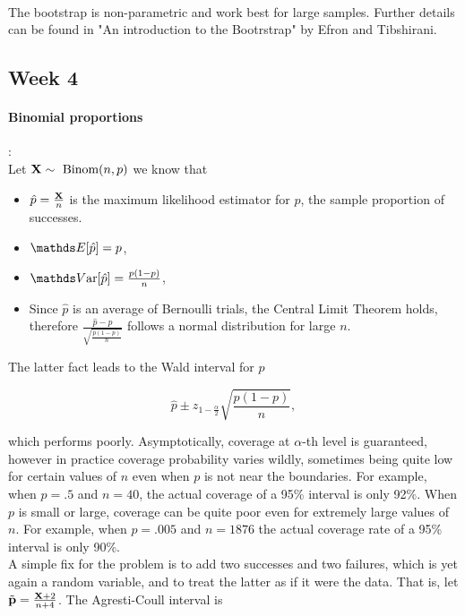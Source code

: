 \documentclass{homework}
\begin{document}
\textnormal{ }\\

The bootstrap is non-parametric and work best for large samples. Further details can be found in "An introduction to the Bootrstrap" by Efron and Tibshirani. 

\subsection{Week 4}

\paragraph{\textbf{Binomial proportions}}: \\

Let ${\bf X} \sim \textnormal{ Binom}(n,p)$ we know that 

\begin{itemize}
    \item $\hat{p}=\frac{{\bf X}}{n}$ is the maximum likelihood estimator for $p$, the sample proportion of successes. 
    \item $\E[\hat{p}] = p$,
    \item $\var[\hat{p}] = \frac{p(1-p)}{n}$,
    \item Since $\hat{p}$ is an average of Bernoulli trials, the Central Limit Theorem holds, therefore
    $\frac{\hat{p}-p}{\sqrt{\frac{p(1-p)}{n}}}$ follows a normal distribution for large $n$. \\
\end{itemize}

The latter fact leads to the Wald interval for $p$

$$
\hat{p} \pm z_{1-\frac{\alpha}{2}} \sqrt{\frac{p(1-p)}{n}},
$$

which performs poorly. Asymptotically, coverage at $\alpha$-th level is guaranteed, however in practice coverage probability varies wildly, sometimes being quite low for certain values of $n$ even when $p$ is not near the boundaries. For example, when $p = .5$ and $n=40$, the actual coverage of a 95\% interval is only 92\%. When $p$ is small or large, coverage can be quite poor even for extremely large values of $n$. For example, when $p=.005$ and $n=1876$ the actual coverage rate of a 95\% interval is only 90\%. \\

A simple fix for the problem is to add two successes and two failures, which is yet again a random variable, and to treat the latter as if it were the data. That is, let $\tilde{\bf p} = \frac{{\bf X}+2}{n+4}$. The Agresti-Coull interval is 
\end{document}
